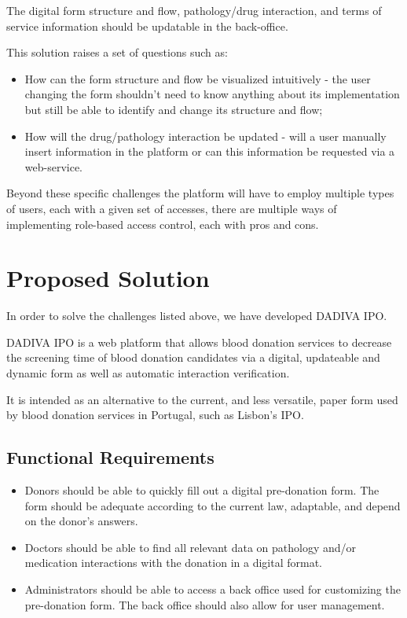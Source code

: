 The digital form structure and flow, pathology/drug interaction, and terms of service information should be updatable in the back-office. 

This solution raises a set of questions such as:
\begin{itemize}
	\item How can the form structure and flow be visualized intuitively - the user changing the form shouldn’t need to know anything about its implementation but still be able to identify and change its structure and flow;
	\item How will the drug/pathology interaction be updated - will a user manually insert information in the platform or can this information be requested via a web-service. 
\end{itemize}

Beyond these specific challenges the platform will have to employ multiple types of users, each with a given set of accesses, there are multiple ways of implementing role-based access control, each with pros and cons.

\section{Proposed Solution}

In order to solve the challenges listed above, we have developed DADIVA IPO.

DADIVA IPO is a web platform that allows blood donation services to decrease the screening time of blood donation candidates via a digital, updateable and dynamic form as well as automatic interaction verification.

It is intended as an alternative to the current, and less versatile, paper form used by blood donation services in Portugal, such as Lisbon's IPO.

\subsection{Functional Requirements}
\begin{itemize}
	\item Donors should be able to quickly fill out a digital pre-donation form. The form should be adequate according to the current law, adaptable, and depend on the donor’s answers.
	
	\item Doctors should be able to find all relevant data on pathology and/or medication interactions with the donation in a digital format.
	
	\item Administrators should be able to access a back office used for customizing the pre-donation form. The back office should also allow for user management.
%	
\end{itemize}

